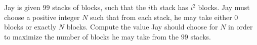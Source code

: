 Jay is given $99$ stacks of blocks, such that the $i$th stack has $i^2$ blocks. Jay must choose a positive integer $N$ such that from each stack, he may take either $0$ blocks or exactly $N$ blocks. Compute the value Jay should choose for $N$ in order to maximize the number of blocks he may take from the $99$ stacks.
